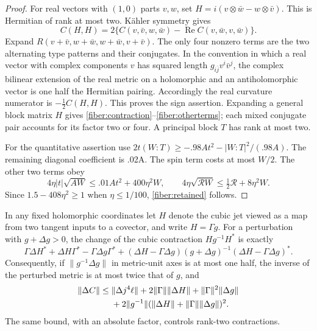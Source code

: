 \begin{proof}
For real vectors with \((1,0)\) parts \(v,w\), set
\(H=i(v\otimes\bar w-w\otimes\bar v)\).  This is Hermitian of
rank at most two.  K\"ahler symmetry gives
\[
 C(H,H)=2\{C(v,\bar v,w,\bar w)
                   -\operatorname{Re}C(v,\bar w,v,\bar w)\}.
\]
Expand \(R(v+\bar v,w+\bar w,w+\bar w,v+\bar v)\).  The only four
nonzero terms are the two alternating type patterns and their
conjugates.  In the convention in which a real vector with complex
components \(v\) has squared length \(g_{i\bar j}v^i\bar v^j\), the complex
bilinear extension of the real metric on a holomorphic and an
antiholomorphic vector is one half the Hermitian pairing.  Accordingly
the real curvature numerator is \(-\tfrac12 C(H,H)\).  This proves the
sign assertion.
Expanding a general block matrix \(H\) gives
\eqref{fiber:contraction}--\eqref{fiber:otherterms}; each mixed
conjugate pair accounts for its factor two or four.  A principal block
\(T\) has rank at most two.

For the quantitative assertion use
\(2t(W:T)\ge-.98At^2-|W:T|^2/(.98A)\).
The remaining diagonal coefficient is .02A.  The spin term costs at
most \(W/2\).  The other two terms obey
\[
 4\eta |t|\sqrt{AW}\le .01At^2+400\eta^2W,
 \qquad
 4\eta\sqrt{\mathcal R W}\le\tfrac12\mathcal R+8\eta^2W.
\]
Since \(1.5-408\eta^2\ge1\) when \(\eta\le1/100\),
\eqref{fiber:retained} follows.
\end{proof}

\begin{lemma}\label{fiber:perturbation}
In any fixed holomorphic coordinates let \(H\) denote the cubic jet viewed
as a map from two tangent inputs to a covector, and write \(H=\Gamma g\).
For a perturbation with \(g+\Delta g>0\), the change of the cubic
contraction \(Hg^{-1}H^*\) is exactly
\begin{equation}\label{fiber:perturbformula}
 \Gamma\Delta H^*+\Delta H\Gamma^*-\Gamma\Delta g\Gamma^*
 +(\Delta H-\Gamma\Delta g)(g+\Delta g)^{-1}
                 (\Delta H-\Gamma\Delta g)^*.
\end{equation}
Consequently, if \(\|g^{-1}\Delta g\|\) in metric-unit axes is at most
one half, the inverse of the perturbed metric is at most twice that
of \(g\), and
\begin{align}\label{fiber:perturbbound}
 \|\Delta C\|\le {}&\|\Delta j^4\ell\|
       +2\|\Gamma\|\|\Delta H\|
       +\|\Gamma\|^2\|\Delta g\|\\
 &+2\|g^{-1}\|
       (\|\Delta H\|+\|\Gamma\|\|\Delta g\|)^2.
 \notag
\end{align}
The same bound, with an absolute factor, controls rank-two contractions.
\end{lemma}


